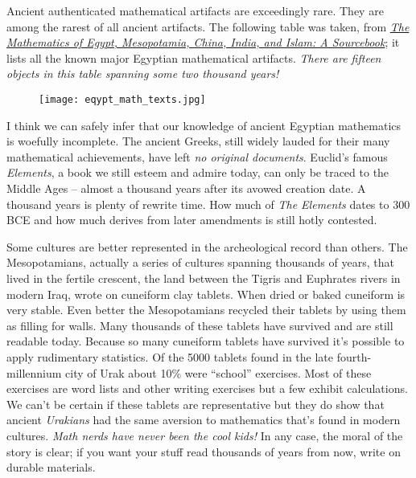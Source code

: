 Ancient authenticated mathematical artifacts are exceedingly rare. They
are among the rarest of all ancient artifacts. The following table was
taken, from
\href{https://press.princeton.edu/books/hardcover/9780691114859/the-mathematics-of-egypt-mesopotamia-china-india-and-islam}{\emph{The
Mathematics of Egypt, Mesopotamia, China, India, and Islam: A
Sourcebook}}; it lists all the known major Egyptian mathematical
artifacts. \emph{There are fifteen objects in this table spanning some
two thousand years!}

 \captionsetup[figure]{labelformat=empty}
\begin{figure}[htbp]
 \centering
\texttt{[image: eqypt\_math\_texts.jpg]}
\label{fig:7765x1}
\end{figure}


I think we can safely infer that our knowledge of ancient Egyptian
mathematics is woefully incomplete. The ancient Greeks, still widely
lauded for their many mathematical achievements, have left \emph{no
original documents}. Euclid's famous \emph{Elements}, a book we still
esteem and admire today, can only be traced to the Middle Ages -- almost
a thousand years after its avowed creation date. A thousand years is
plenty of rewrite time. How much of \emph{The Elements} dates to 300 BCE
and how much derives from later amendments is still hotly contested.

Some cultures are better represented in the archeological record than
others. The Mesopotamians, actually a series of cultures spanning
thousands of years, that lived in the fertile crescent, the land between
the Tigris and Euphrates rivers in modern Iraq, wrote on cuneiform clay
tablets. When dried or baked cuneiform is very stable. Even better the
Mesopotamians recycled their tablets by using them as filling for walls.
Many thousands of these tablets have survived and are still readable
today. Because so many cuneiform tablets have survived it's possible to
apply rudimentary statistics. Of the 5000 tablets found in the late
fourth-millennium city of Urak about 10\% were ``school'' exercises.
Most of these exercises are word lists and other writing exercises but a
few exhibit calculations. We can't be certain if these tablets are
representative but they do show that ancient \emph{Urakians} had the
same aversion to mathematics that's found in modern cultures. \emph{Math
nerds have never been the cool kids!} In any case, the moral of the
story is clear; if you want your stuff read thousands of years from now,
write on durable materials.

